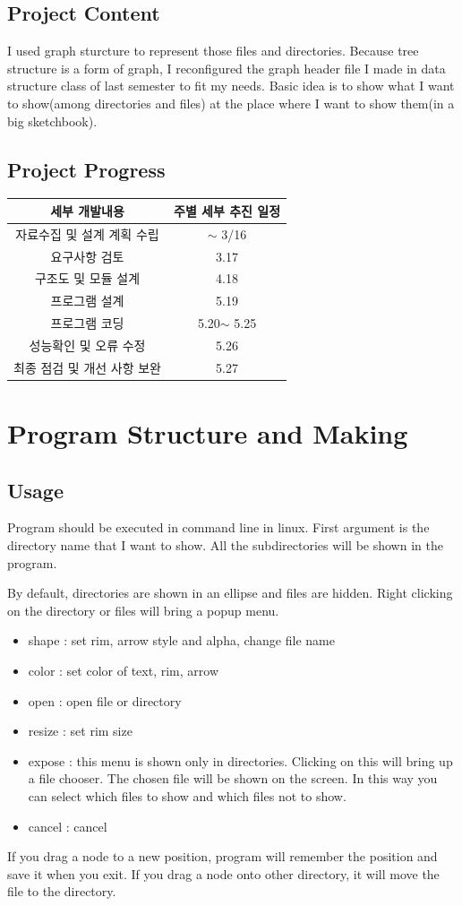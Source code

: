 \documentclass[12pt,a4paper]{report}
\begin{document}
\section{Project Content}
I used graph sturcture to represent those files and directories. Because tree structure is a form of graph, I
reconfigured the graph header file I made in data structure class of last semester to fit my needs.
Basic idea is to show what I want to show(among directories and files) at the place where I want to show
them(in a big sketchbook).

\section{Project Progress}

\begin{tabular}{|c|c|}
	\hline
	세부 개발내용&주별 세부 추진 일정\\
	\hline
	자료수집 및 설계 계획 수립&$\sim$ 3/16\\
	요구사항 검토&3.17\\
	구조도 및 모듈 설계&4.18\\
	프로그램 설계&5.19\\
	프로그램 코딩&5.20$\sim$ 5.25\\
	성능확인 및 오류 수정&5.26\\
	최종 점검 및 개선 사항 보완&5.27\\
	\hline
\end{tabular}
\chapter{Program Structure and Making}
\section{Usage}
Program should be executed in command line in linux.
First argument is the directory name that I want to show.
All the subdirectories will be shown in the program.

By default, directories are shown in an ellipse and files are hidden.
Right clicking on the directory or files will bring a popup menu.
\begin{itemize}
	\item shape : set rim, arrow style and alpha, change file name
	\item color : set color of text, rim, arrow
	\item open : open file or directory
	\item resize : set rim size
	\item expose : this menu is shown only in directories. Clicking on this will bring up a file chooser. The chosen file will be shown on the screen. In this way you can select which files to show and which files not to show.
	\item cancel : cancel
\end{itemize}
If you drag a node to a new position, program will remember the position and save it when you exit.
If you drag a node onto other directory, it will move the file to the directory.
\end{document}
